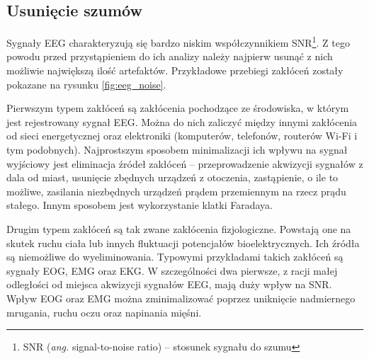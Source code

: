 \documentclass[skorowidz,skroty]{dyplomWEZUT}
\begin{document}
\subsection{Usunięcie szumów}
Sygnały EEG charakteryzują się bardzo niskim współczynnikiem SNR\footnote{SNR (\textit{ang.} signal-to-noise ratio) -- stosunek sygnału do szumu}\cite{bci_trends}. Z tego powodu przed przystąpieniem do ich analizy należy najpierw usunąć z nich możliwie największą ilość artefaktów. Przykładowe przebiegi zakłóceń zostały pokazane na rysunku \vref{fig:eeg_noise}.

Pierwszym typem zakłóceń są zakłócenia pochodzące ze środowiska, w którym jest rejestrowany sygnał EEG. Można do nich zaliczyć między innymi zakłócenia od sieci energetycznej oraz elektroniki (komputerów, telefonów, routerów Wi-Fi i tym podobnych). Najprostszym sposobem minimalizacji ich wpływu na sygnał wyjściowy jest eliminacja źródeł zakłóceń -- przeprowadzenie akwizycji sygnałów z dala od miast, usunięcie zbędnych urządzeń z otoczenia, zastąpienie, o ile to możliwe, zasilania niezbędnych urządzeń prądem przemiennym na rzecz prądu stałego. Innym sposobem jest wykorzystanie klatki Faradaya.

Drugim typem zakłóceń są tak zwane zakłócenia fizjologiczne. Powstają one na skutek ruchu ciała lub innych fluktuacji potencjałów bioelektrycznych. Ich źródła są niemożliwe do wyeliminowania. Typowymi przykładami takich zakłóceń są sygnały EOG, EMG oraz EKG. W szczególności dwa pierwsze, z racji małej odległości od miejsca akwizycji sygnałów EEG, mają duży wpływ na SNR. Wpływ EOG oraz EMG można zminimalizować poprzez uniknięcie nadmiernego mrugania, ruchu oczu oraz napinania mięśni.
\end{document}
